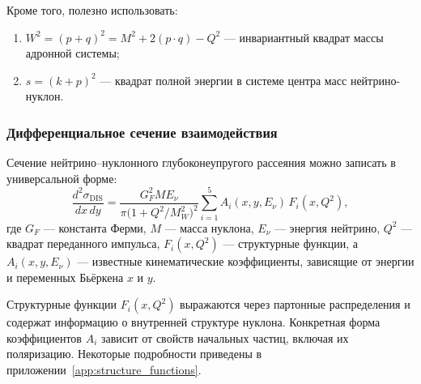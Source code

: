 Кроме того, полезно использовать:
\begin{enumerate}
  \item \( W^2 = (p + q)^2 = M^2 + 2(p \cdot q) - Q^2 \) — инвариантный квадрат массы адронной системы;
  \item \( s = (k + p)^2 \) — квадрат полной энергии в системе центра масс нейтрино-нуклон.
\end{enumerate}

\subsubsection{Дифференциальное сечение взаимодействия}

Сечение нейтрино–нуклонного глубоконеупругого рассеяния можно записать в универсальной форме:
\begin{equation}
  \frac{d^2 \sigma_{\text{DIS}}}{dx\,dy} =
  \frac{G_F^2 M E_\nu}{\pi \bigl(1 + Q^2/M_W^2\bigr)^2}
  \sum_{i=1}^{5} A_i(x, y, E_\nu)\, F_i(x, Q^2),
  \label{eq:xsec_general}
\end{equation}
где \( G_F \) — константа Ферми, \( M \) — масса нуклона, \( E_\nu \) — энергия нейтрино, \( Q^2 \) — квадрат переданного импульса, \( F_i(x, Q^2) \) — структурные функции, а \( A_i(x, y, E_\nu) \) — известные кинематические коэффициенты, зависящие от энергии и переменных Бьёркена \( x \) и \( y \).

Структурные функции \( F_i(x, Q^2) \) выражаются через партонные распределения и содержат информацию о внутренней структуре нуклона. Конкретная форма коэффициентов \( A_i \) зависит от свойств начальных частиц, включая их поляризацию. Некоторые подробности приведены в приложении~\ref{app:structure_functions}.
